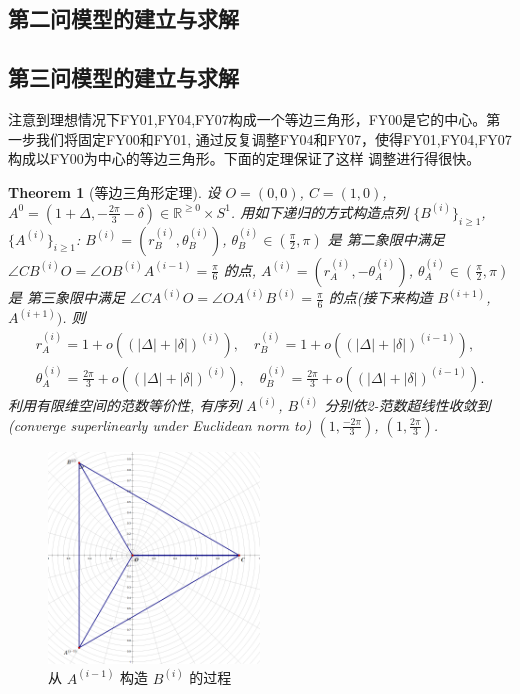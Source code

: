 \documentclass{my_paper}
\newcommand{\R}{\mathbb{R}}
\newtheorem{theorem}{Theorem}
\begin{document}
\subsection{第二问模型的建立与求解}

\subsection{第三问模型的建立与求解}
    注意到理想情况下FY01,FY04,FY07构成一个等边三角形，FY00是它的中心。第一步我们将固定FY00和FY01,
    通过反复调整FY04和FY07，使得FY01,FY04,FY07构成以FY00为中心的等边三角形。下面的定理保证了这样
    调整进行得很快。
\begin{theorem}[等边三角形定理]
\label{dbsjx} 
    设 $O=(0,0)$, $C=(1,0)$,   
    $A^{0}=(1+\Delta,-\frac{2\pi}3-\delta)\in \R^{\geq 0}\times S^1$. 用如下递归的方式构造点列
    $\{B^{(i)}\}_{i\geq 1}$, $\{A^{(i)}\}_{i\geq 1}$: 
    $B^{(i)}=(r_B^{(i)},\theta_B^{(i)})$, $\theta_{B}^{(i)}\in (\frac \pi 2,\pi)$ 是
    第二象限中满足 $\angle CB^{(i)}O=\angle OB^{(i)}A^{(i-1)}=\frac\pi6$ 的点, 
    $A^{(i)}=(r_A^{(i)},-\theta_A^{(i)})$, $\theta_{A}^{(i)}\in (\frac \pi 2,\pi)$ 是
    第三象限中满足 $\angle CA^{(i)}O=\angle OA^{(i)}B^{(i)}=\frac\pi6$ 的点(接下来构造 $B^{(i+1)}$, $A^{(i+1)})$. 
    则 
    \begin{equation}
    \begin{aligned}
        r_A^{(i)}=1+o((|\Delta|+|\delta|)^{(i)}),\quad r_B^{(i)}=1+o((|\Delta|+|\delta|)^{(i-1)}),
        \\
        \theta_A^{(i)}=\frac{2\pi}{3}+o((|\Delta|+|\delta|)^{(i)}),\quad \theta_B^{(i)}=\frac{2\pi}{3}+o((|\Delta|+|\delta|)^{(i-1)}).
    \end{aligned}
    \label{1}
    \end{equation}
    利用有限维空间的范数等价性, 有序列 $A^{(i)}$, $B^{(i)}$ 分别依2-范数超线性收敛到
    (converge superlinearly under Euclidean norm to) $(1,\frac{-2\pi}3)$, $(1,\frac{2\pi}3)$.
\end{theorem} 

\begin{figure}[h]
    \centering
    \includegraphics[width=0.5\textwidth]{sketch1}
    \caption{从 $A^{(i-1)}$ 构造 $B^{(i)}$ 的过程} 
\end{figure}
\end{document}
